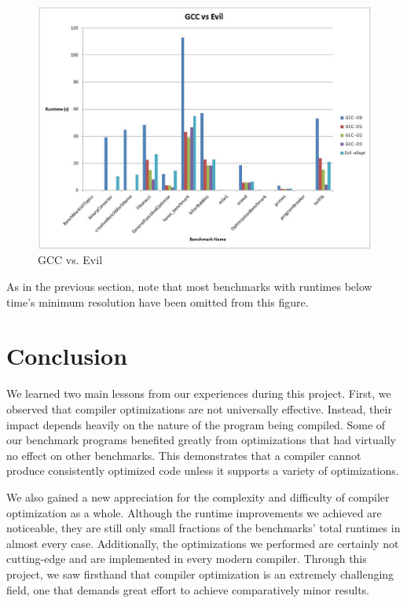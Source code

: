 \documentclass[12pt]{article}
\begin{document}
\begin{figure}[H]
   \centering
      \includegraphics[width=\textwidth]{evil_vs_gcc.png}
   \caption{GCC vs. Evil}
   \label{fig:evilVsGcc}
\end{figure}

As in the previous section, note that most benchmarks with runtimes below time's minimum resolution have been omitted from this figure.

\section{Conclusion}
We learned two main lessons from our experiences during this project.
First, we observed that compiler optimizations are not universally effective.
Instead, their impact depends heavily on the nature of the program being compiled.
Some of our benchmark programs benefited greatly from optimizations that had virtually no effect on other benchmarks.
This demonstrates that a compiler cannot produce consistently optimized code unless it supports a variety of optimizations.

We also gained a new appreciation for the complexity and difficulty of compiler optimization as a whole.
Although the runtime improvements we achieved are noticeable, they are still only small fractions of the benchmarks' total runtimes in almost every case.
Additionally, the optimizations we performed are certainly not cutting-edge and are implemented in every modern compiler.
Through this project, we saw firsthand that compiler optimization is an extremely challenging field, one that demands great effort to achieve comparatively minor results.

\newpage


\end{document}
